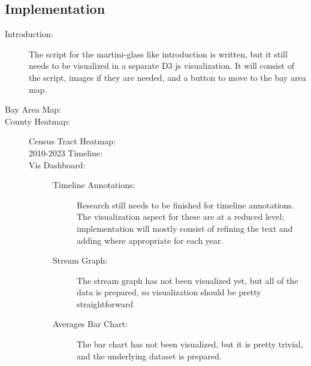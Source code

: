 \documentclass{article}
\begin{document}


\subsection{Implementation}

\begin{description}

    \item[Introduction:] The script for the martini-glass like introduction is written, but it still needs to be visualized in a separate D3 js visualization. It will consist of the script, images if they are needed, and a button to move to the bay area map.
    
    \item[Bay Area Map:] 
    
    \item[County Heatmap:] 
    
    \begin{description}
    
        \item[Census Tract Heatmap:] 
        
        \item[2010-2023 Timeline:] 
        
        \item[Vis Dashboard:] 
        
        \begin{description}
        
            \item[Timeline Annotations:] Research still needs to be finished for timeline annotations. The visualization aspect for these are at a reduced level; implementation will mostly consist of refining the text and adding where appropriate for each year.
            
            \item[Stream Graph:] The stream graph has not been visualized yet, but all of the data is prepared, so visualization should be pretty straightforward
            
            \item[Averages Bar Chart:] The bar chart has not been visualized, but it is pretty trivial, and the underlying dataset is prepared.
            
        \end{description}
        
    \end{description}
    
\end{description}
\end{document}
